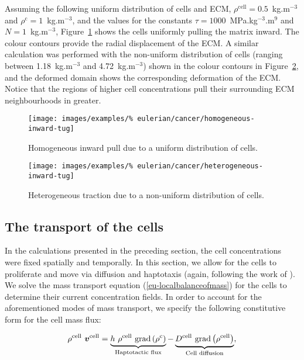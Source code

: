 Assuming the following uniform distribution of cells and ECM,
$\rho^{\mathrm{cell}}=0.5$~kg.m$^{-3}$ and
$\rho^{\mathrm{c}}=1$~kg.m$^{-3}$, and the values for the constants
$\tau=1000$~MPa.kg$^{-3}$.m$^{9}$ and $N=1$~kg.m$^{-3}$,
Figure~\ref{tumour-homogeneous-inward-tug} shows the cells uniformly
pulling the matrix inward. The colour contours provide the radial
displacement of the ECM. A similar calculation was performed with the
non-uniform distribution of cells (ranging between 1.18~kg.m$^{-3}$
and 4.72~kg.m$^{-3}$) shown in the colour contours in
Figure~\ref{tumour-heterogeneous-inward-tug}, and the deformed domain
shows the corresponding deformation of the ECM. Notice that the
regions of higher cell concentrations pull their surrounding ECM
neighbourhoods in greater.

\begin{figure}[!hptb]
\centering
\texttt{[image: images/examples/\%
eulerian/cancer/homogeneous-inward-tug]}
\caption{Homogeneous inward pull due to a uniform distribution of
  cells.}
\label{tumour-homogeneous-inward-tug}
\end{figure}

\begin{figure}[!hptb]
\centering
\texttt{[image: images/examples/\%
eulerian/cancer/heterogeneous-inward-tug]}
\caption{Heterogeneous traction due to a non-uniform distribution of
  cells.}
\label{tumour-heterogeneous-inward-tug}
\end{figure}

\clearpage

\subsection{The transport of the cells}
\label{cell-transport}

In the calculations presented in the preceding section, the cell
concentrations were fixed spatially and temporally. In this section,
we allow for the cells to proliferate and move via diffusion and
haptotaxis (again, following the work of \citet{namyetal:04}). We
solve the mass transport equation (\ref{eu-localbalanceofmass}) for
the cells to determine their current concentration
fields. In order to account for the aforementioned modes of mass
transport, we specify the following constitutive form for the cell
mass flux:

\begin{equation}
\rho^{\mathrm{cell}}\ \bv^{\mathrm{cell}} = \underbrace{h\ \rho^{\mathrm{cell}}\
\mathrm{grad}\left(\rho^{\mathrm{c}}\right)}_{\text{Haptotactic flux}}
-\underbrace{D^{\mathrm{cell}}\ \mathrm{grad}\left(\rho^{\mathrm{cell}}\right)
}_{\text{Cell diffusion}},
\end{equation}

